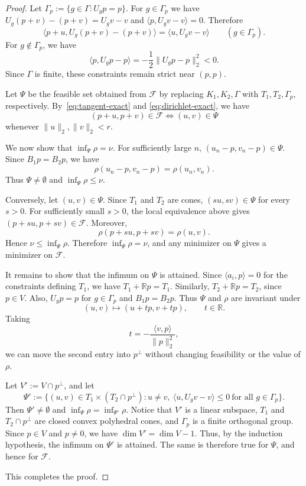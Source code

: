 \documentclass[11pt]{article}
\newcommand{\R}{\mathbb{R}}
\newcommand{\inner}[2]{\langle #1, #2 \rangle}
\theoremstyle{definition}
\begin{document}
\begin{proof}
	Let $\Gamma_p:=\{g\in\Gamma:U_gp=p\}$.
	For $g\in\Gamma_p$ we have
	$U_g(p+v)-(p+v)=U_gv-v$ and
	$\inner{p}{U_gv-v}=0$. Therefore
	\begin{equation}\label{eq:dirichlet-exact}
		\inner{p+u}{U_g(p+v)-(p+v)}
		=\inner{u}{U_gv-v}
		\qquad(g\in\Gamma_p).
	\end{equation}
	For $g\notin\Gamma_p$, we have
	\[
	\inner{p}{U_gp-p}
	=-\frac12\|U_gp-p\|_2^2<0.
	\]
	Since $\Gamma$ is finite, these constraints
	remain strict near $(p,p)$.
	
	Let $\Psi$ be the feasible set obtained from
	$\mathcal F$ by replacing $K_1,K_2,\Gamma$
	with $T_1,T_2,\Gamma_p$, respectively.
	By~\eqref{eq:tangent-exact} and
	\eqref{eq:dirichlet-exact}, we have
	\[
	(p+u,p+v)\in\mathcal F
	\iff (u,v)\in\Psi
	\]
	whenever $\|u\|_2,\|v\|_2<r$.
	
	We now show that $\inf_\Psi\rho=\nu$.
	For sufficiently large $n$,
	$(u_n-p,v_n-p)\in\Psi$. Since
	$B_1p=B_2p$, we have
	\[
	\rho(u_n-p,v_n-p)=\rho(u_n,v_n).
	\]
	Thus $\Psi\neq\emptyset$ and
	$\inf_\Psi\rho\le\nu$.
	
	Conversely, let $(u,v)\in\Psi$.
	Since $T_1$ and $T_2$ are cones,
	$(su,sv)\in\Psi$ for every $s>0$.
	For sufficiently small $s>0$, the local
	equivalence above gives
	$(p+su,p+sv)\in\mathcal F$.
	Moreover,
	\[
	\rho(p+su,p+sv)=\rho(u,v).
	\]
	Hence $\nu\le\inf_\Psi\rho$.
	Therefore $\inf_\Psi\rho=\nu$, and
	any minimizer on $\Psi$ gives a
	minimizer on $\mathcal F$.
	
	It remains to show that the infimum on
	$\Psi$ is attained.
	Since $\inner{a_i}{p}=0$ for the
	constraints defining $T_1$, we have
	$T_1+\R p=T_1$.
	Similarly, $T_2+\R p=T_2$, since $p\in V$.
	Also, $U_gp=p$ for $g\in\Gamma_p$ and
	$B_1p=B_2p$. Thus $\Psi$ and $\rho$
	are invariant under
	\[
	(u,v)\mapsto(u+tp,v+tp),
	\qquad t\in\R.
	\]
	Taking
	\[
	t=-\frac{\inner{v}{p}}{\|p\|_2^2},
	\]
	we can move the second entry into
	$p^\perp$ without changing feasibility
	or the value of $\rho$.
	

Let $V':=V\cap p^\perp$, and let
\[
\Psi':=\bigl\{(u,v)\in T_1\times(T_2\cap p^\perp):
u\neq v,\ \inner{u}{U_gv-v}\le0
\ \text{for all }g\in\Gamma_p\bigr\}.
\]
Then $\Psi'\neq\emptyset$ and
$\inf_\Psi\rho=\inf_{\Psi'}\rho$.
Notice that $V'$ is a linear subspace,
$T_1$ and $T_2\cap p^\perp$ are closed
convex polyhedral cones, and $\Gamma_p$
is a finite orthogonal group.
Since $p\in V$ and $p\neq0$, we have
$\dim V'=\dim V-1$.
Thus, by the induction hypothesis,
the infimum on $\Psi'$ is attained.
The same is therefore true for $\Psi$,
and hence for $\mathcal F$.

This completes the proof.
\end{proof}
\end{document}
